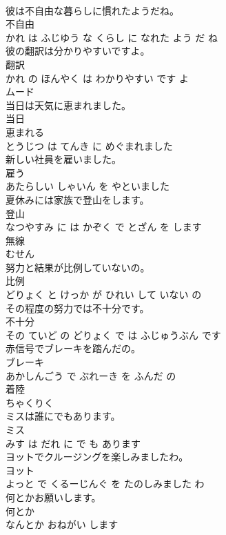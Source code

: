 \documentclass[8pt]{extreport}
\begin{document}
\begin{CJK}{UTF8}{min}
\\	彼は不自由な暮らしに慣れたようだね。	
\\	不自由 
\\	かれ は ふじゆう な くらし に なれた よう だ ね			
\\	彼の翻訳は分かりやすいですよ。	
\\	翻訳 
\\	かれ の ほんやく は わかりやすい です よ			
\\	ムード	
\\	当日は天気に恵まれました。	
\\	当日 
\\	恵まれる 
\\	とうじつ は てんき に めぐまれました			
\\	新しい社員を雇いました。	
\\	雇う 
\\	あたらしい しゃいん を やといました			
\\	夏休みには家族で登山をします。	
\\	登山 
\\	なつやすみ に は かぞく で とざん を します			
\\	無線	
\\	むせん			
\\	努力と結果が比例していないの。	
\\	比例 
\\	どりょく と けっか が ひれい して いない の			
\\	その程度の努力では不十分です。	
\\	不十分 
\\	その ていど の どりょく で は ふじゅうぶん です			
\\	赤信号でブレーキを踏んだの。	
\\	ブレーキ 
\\	あかしんごう で ぶれーき を ふんだ の			
\\	着陸	
\\	ちゃくりく			
\\	ミスは誰にでもあります。	
\\	ミス 
\\	みす は だれ に で も あります			
\\	ヨットでクルージングを楽しみましたわ。	
\\	ヨット 
\\	よっと で くるーじんぐ を たのしみました わ			
\\	何とかお願いします。	
\\	何とか 
\\	なんとか おねがい します			

\end{CJK}
\end{document}
